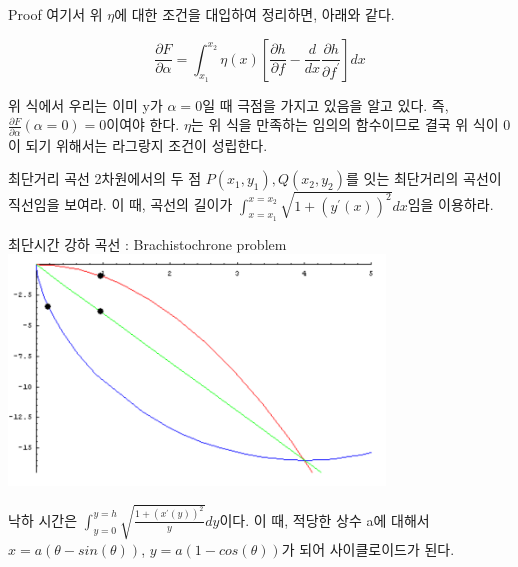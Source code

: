 \documentclass{beamer}
\begin{document}
\begin{frame}[allowframebreaks]{Proof}
여기서 위 $\eta$에 대한 조건을 대입하여 정리하면, 아래와 같다. 

\begin{equation} 
\frac{\partial F}{\partial \alpha} = \int^{x_2}_{x_1} \eta(x) [ \frac{\partial h}{\partial f}-\frac{d}{dx}\frac{\partial h}{\partial f^{\prime}}] dx 
\end{equation}

위 식에서 우리는 이미 y가 $\alpha=0$일 때 극점을 가지고 있음을 알고 있다. 즉, $\frac{\partial F}{\partial \alpha}(\alpha = 0) = 0$이여야 한다.  $\eta$는 위 식을 만족하는 임의의 함수이므로 결국 위 식이 0이 되기 위해서는 라그랑지 조건이 성립한다. 


\end{frame}


\begin{frame}{최단거리 곡선} 
2차원에서의 두 점 $P(x_1, y_1), Q(x_2, y_2)$를 잇는 최단거리의 곡선이 직선임을 보여라. 이 때, 곡선의 길이가 $\int_{x=x_1}^{x=x_2} \sqrt{1+(y^{\prime}(x))^2} dx$임을 이용하라. 

\end{frame}


\begin{frame}{최단시간 강하 곡선 : Brachistochrone problem } 
\includegraphics[width=10cm,keepaspectratio]{bra}

낙하 시간은 $\int^{y=h}_{y=0} \sqrt{\frac{1+(x^{\prime}(y))^2}{y}} dy$이다. 이 때, 적당한 상수 a에 대해서 $x=a(\theta-sin (\theta))$, $y = a(1-cos(\theta))$가 되어 사이클로이드가 된다. 
\end{frame}
\end{document}
